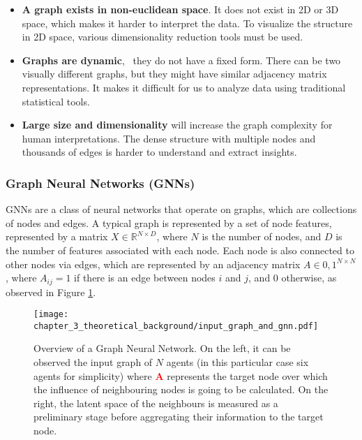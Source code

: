 \begin{itemize}
	
	\item \textbf{A graph exists in non-euclidean space}. It does not exist in 2D or 3D space, which makes it harder to interpret the data. To visualize the structure in 2D space, various dimensionality reduction tools must be used.
	
	\item \textbf{Graphs are dynamic}, \ie \ they do not have a fixed form. There can be two visually different graphs, but they might have similar adjacency matrix representations. It makes it difficult for us to analyze data using traditional statistical tools.
	
	\item \textbf{Large size and dimensionality} will increase the graph complexity for human interpretations. The dense structure with multiple nodes and thousands of edges is harder to understand and extract insights. 
	
\end{itemize}

\subsubsection{Graph Neural Networks (GNNs)}
\label{subsubsec:3_gnns}

\acfp{GNN} are a class of neural networks that operate on graphs, which are collections of nodes and edges. A typical graph is represented by a set of node features, represented by a matrix $X \in \mathbb{R}^{N \times D}$, where $N$ is the number of nodes, and $D$ is the number of features associated with each node. Each node is also connected to other nodes via edges, which are represented by an adjacency matrix $A \in {0,1}^{N \times N}$, where $A_{ij} = 1$ if there is an edge between nodes $i$ and $j$, and $0$ otherwise, as observed in Figure \ref{fig:chapter_3_theoretical_background/gnn}.

\begin{figure}[h]
	\centering
	\texttt{[image: chapter\_3\_theoretical\_background/input\_graph\_and\_gnn.pdf]}
	\captionsetup{justification=justified}
	\caption[Overview of a Graph Neural Network]{Overview of a Graph Neural Network. On the left, it can be observed the input graph of $N$ agents (in this particular case six agents for simplicity) where \textbf{\textcolor{red}{A}} represents the target node over which the influence of neighbouring nodes is going to be calculated. On the right, the latent space of the neighbours is measured as a preliminary stage before aggregating their information to the target node.}
	\label{fig:chapter_3_theoretical_background/gnn}
\end{figure}

